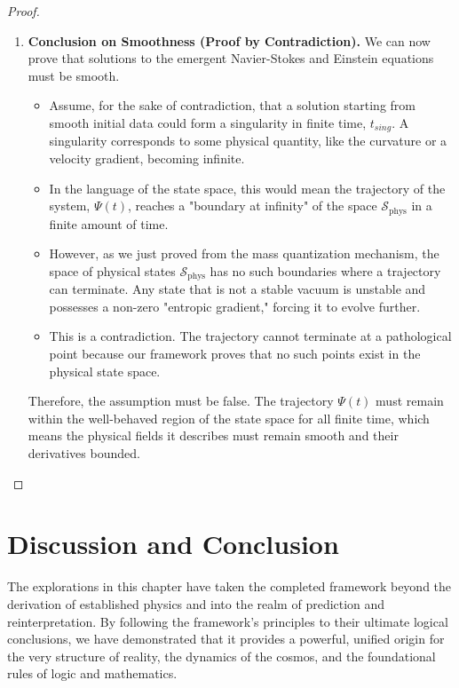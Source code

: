\documentclass[11pt, letterpaper]{report}
\theoremstyle{plain} %
\theoremstyle{definition} %
\theoremstyle{remark} %
\begin{document}
\begin{proof}
\begin{enumerate}
    \item \textbf{Conclusion on Smoothness (Proof by Contradiction).}
    We can now prove that solutions to the emergent Navier-Stokes and Einstein equations must be smooth.
    \begin{itemize}
        \item Assume, for the sake of contradiction, that a solution starting from smooth initial data could form a singularity in finite time, $t_{sing}$. A singularity corresponds to some physical quantity, like the curvature or a velocity gradient, becoming infinite.
        \item In the language of the state space, this would mean the trajectory of the system, $\Psi(t)$, reaches a "boundary at infinity" of the space $\mathcal{S}_{\text{phys}}$ in a finite amount of time.
        \item However, as we just proved from the mass quantization mechanism, the space of physical states $\mathcal{S}_{\text{phys}}$ has no such boundaries where a trajectory can terminate. Any state that is not a stable vacuum is unstable and possesses a non-zero "entropic gradient," forcing it to evolve further.
        \item This is a contradiction. The trajectory cannot terminate at a pathological point because our framework proves that no such points exist in the physical state space.
    \end{itemize}
    Therefore, the assumption must be false. The trajectory $\Psi(t)$ must remain within the well-behaved region of the state space for all finite time, which means the physical fields it describes must remain smooth and their derivatives bounded.
\end{enumerate}
\end{proof}



\section{Discussion and Conclusion}
\label{sec:explorations_conclusion}

The explorations in this chapter have taken the completed framework beyond the derivation of established physics and into the realm of prediction and reinterpretation. By following the framework's principles to their ultimate logical conclusions, we have demonstrated that it provides a powerful, unified origin for the very structure of reality, the dynamics of the cosmos, and the foundational rules of logic and mathematics.
\end{document}
